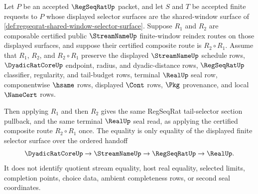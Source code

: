 \begin{theorem}
\label{thm:regseqrat-shared-window-reindex-composition-law}
Let $P$ be an accepted $\RegSeqRatUp$ packet, and let $S$ and $T$ be accepted finite requests to $P$ whose displayed selector surfaces are the shared-window surface of \autoref{def:regseqrat-shared-window-selector-surface}. Suppose $R_1$ and $R_2$ are composable certified public $\StreamNameUp$ finite-window reindex routes on those displayed surfaces, and suppose their certified composite route is $R_2 \circ R_1$. Assume that $R_1$, $R_2$, and $R_2 \circ R_1$ preserve the displayed $\StreamNameUp$ schedule rows, $\DyadicRatCoreUp$ endpoint, radius, and dyadic-distance rows, $\RegSeqRatUp$ classifier, regularity, and tail-budget rows, terminal $\RealUp$ seal row, componentwise $\hsame$ rows, displayed $\Cont$ rows, $\Pkg$ provenance, and local $\NameCert$ rows.

Then applying $R_1$ and then $R_2$ gives the same RegSeqRat tail-selector section pullback, and the same terminal $\RealUp$ seal read, as applying the certified composite route $R_2 \circ R_1$ once. The equality is only equality of the displayed finite selector surface over the ordered handoff
$$
\DyadicRatCoreUp \to \StreamNameUp \to \RegSeqRatUp \to \RealUp .
$$
It does not identify quotient stream equality, host real equality, selected limits, completion points, choice data, ambient completeness rows, or second seal coordinates.
\end{theorem}
